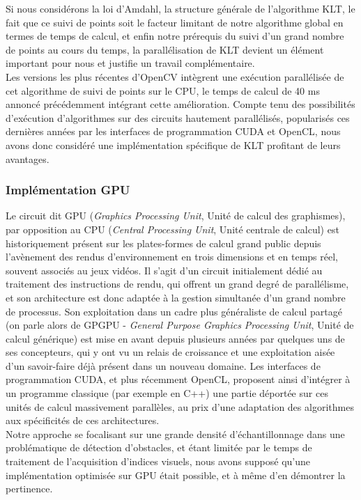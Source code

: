 Si nous considérons la loi d'Amdahl, la structure générale de l'algorithme KLT, le fait que ce suivi de points soit le facteur limitant de notre algorithme global en termes de temps de calcul, et enfin notre prérequis du suivi d'un grand nombre de points au cours du temps, la parallélisation de KLT devient un élément important pour nous et justifie un travail complémentaire.\\
Les versions les plus récentes d'OpenCV intègrent une exécution parallélisée de cet algorithme de suivi de points sur le CPU, le temps de calcul de 40 ms annoncé précédemment intégrant cette amélioration. Compte tenu des possibilités d'exécution d'algorithmes sur des circuits hautement parallélisés, popularisés ces dernières années par les interfaces de programmation CUDA et OpenCL, nous avons donc considéré une implémentation spécifique de KLT profitant de leurs avantages.

\subsubsection{Implémentation GPU}
Le circuit dit GPU (\emph{Graphics Processing Unit}, Unité de calcul des graphismes), par opposition au CPU (\emph{Central Processing Unit}, Unité centrale de calcul) est historiquement présent sur les plates-formes de calcul grand public depuis l'avènement des rendus d'environnement en trois dimensions et en temps réel, souvent associés au jeux vidéos. Il s'agit d'un circuit initialement dédié au traitement des instructions de rendu, qui offrent un grand degré de parallélisme, et son architecture est donc adaptée à la gestion simultanée d'un grand nombre de processus. Son exploitation dans un cadre plus généraliste de calcul partagé (on parle alors de GPGPU - \emph{General Purpose Graphics Processing Unit}, Unité de calcul générique) est mise en avant depuis plusieurs années par quelques uns de ses concepteurs, qui y ont vu un relais de croissance et une exploitation aisée d'un savoir-faire déjà présent dans un nouveau domaine. Les interfaces de programmation CUDA, et plus récemment OpenCL, proposent ainsi d'intégrer à un programme classique (par exemple en C++) une partie déportée sur ces unités de calcul massivement parallèles, au prix d'une adaptation des algorithmes aux spécificités de ces architectures. \\

Notre approche se focalisant sur une grande densité d'échantillonnage dans une problématique de détection d'obstacles, et étant limitée par le temps de traitement de l'acquisition d'indices visuels, nous avons supposé qu'une implémentation optimisée sur GPU était possible, et à même d'en démontrer la pertinence. \\

